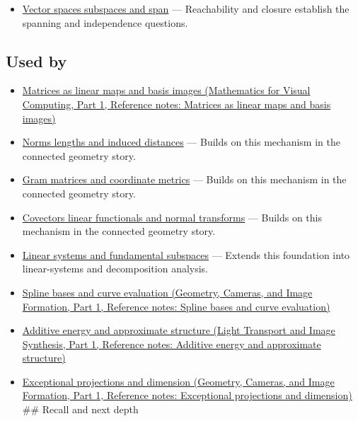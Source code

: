 \begin{itemize}
\tightlist
\item
  \hyperref[appendix-173b52c063ae]{Vector spaces subspaces and span} --- Reachability and closure establish the spanning and independence questions.
\end{itemize}

\subsection{Used by}\label{appendix-ce0341f7ea0d-used-by}

\hypertarget{appendix-ce0341f7ea0d-used-by}{}

\begin{itemize}
\item
  \href{../02-Mathematics-for-Visual-Computing-P01/main.pdf\#nameddest=appendix-bd39c3bf5d64}{Matrices as linear maps and basis images (Mathematics for Visual Computing, Part 1, Reference notes: Matrices as linear maps and basis images)}
\item
  \hyperref[appendix-49933872bb51]{Norms lengths and induced distances} --- Builds on this mechanism in the connected geometry story.
\item
  \hyperref[appendix-3b863809f82a]{Gram matrices and coordinate metrics} --- Builds on this mechanism in the connected geometry story.
\item
  \hyperref[appendix-46da295c6787]{Covectors linear functionals and normal transforms} --- Builds on this mechanism in the connected geometry story.
\item
  \hyperref[appendix-8572a4a060c1]{Linear systems and fundamental subspaces} --- Extends this foundation into linear-systems and decomposition analysis.
\item
  \href{../03-Geometry-Cameras-and-Image-Formation-P01/main.pdf\#nameddest=appendix-f28eeec97a3d}{Spline bases and curve evaluation (Geometry, Cameras, and Image Formation, Part 1, Reference notes: Spline bases and curve evaluation)}
\item
  \href{../04-Light-Transport-and-Image-Synthesis-P01/main.pdf\#nameddest=appendix-b0732b22e7d6}{Additive energy and approximate structure (Light Transport and Image Synthesis, Part 1, Reference notes: Additive energy and approximate structure)}
\item
  \href{../03-Geometry-Cameras-and-Image-Formation-P01/main.pdf\#nameddest=appendix-3c73f7862157}{Exceptional projections and dimension (Geometry, Cameras, and Image Formation, Part 1, Reference notes: Exceptional projections and dimension)} \#\# Recall and next depth
\end{itemize}

